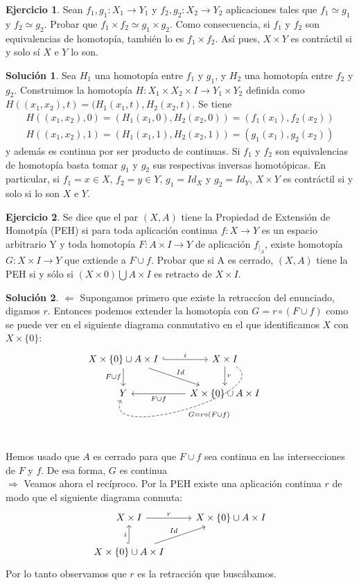 \documentclass{article}
\theoremstyle{plain}
\theoremstyle{definition}
\newtheorem{exercise}{Ejercicio}
\newtheorem*{sol*}{Solución}
\begin{document}
\newpage
\begin{exercise}
Sean $f_1,g_1:X_1\to Y_1$ y $f_2,g_2:X_2\to Y_2$ aplicaciones tales que $f_1\simeq g_1$ y $f_2\simeq g_2$. Probar que $f_1\times f_2\simeq g_1\times g_2$. Como consecuencia, si $f_1$ y $f_2$ son equivalencias de homotopía, también lo es $f_1\times f_2$. Así pues, $X\times Y$ es contráctil si y solo sí $X$ e $Y$ lo son.
\end{exercise}
\begin{sol*}
Sea $H_1$ una homotopía entre $f_1$ y $g_1$, y $H_2$ una homotopía entre $f_2$ y $g_2$. Construimos la homotopía $H:X_1\times X_2\times I\to Y_1\times Y_2$ definida como $H((x_1,x_2),t)=(H_1(x_1,t),H_2(x_2,t)$. Se tiene
\begin{gather*}
H((x_1,x_2),0)=(H_1(x_1,0),H_2(x_2,0))=(f_1(x_1),f_2(x_2))\\
H((x_1,x_2),1)=(H_1(x_1,1),H_2(x_2,1))=(g_1(x_1),g_2(x_2))
\end{gather*}
y además es continua por ser producto de continuas. Si $f_1$ y $f_2$ son equivalencias de homotopía basta tomar $g_1$ y $g_2$ sus respectivas inversas homotópicas. En particular, si $f_1=x\in X$, $f_2=y\in Y$, $g_1=Id_X$ y $g_2=Id_Y$, $X\times Y$ es contráctil si y solo si lo son $X$ e $Y$. 
\end{sol*}
\newpage
\begin{exercise}
Se dice que el par $(X,A)$ tiene la Propiedad de Extensión de Homotpía (PEH) si para toda aplicación continua $f:X\to Y$ es un espacio arbitrario Y y toda homotopía $F:A\times I \to Y$ de aplicación $f_{|_A}$, existe homotopía $G:X\times I \to Y$ que extiende a $F\cup f$. Probar que si A es cerrado, $(X,A)$ tiene la PEH si y sólo si $(X\times 0)\bigcup A\times I$ es retracto de $X\times I$.
\end{exercise}
\begin{sol*}
$\boxed{\Leftarrow}$ Supongamos primero que existe la retraccíon del enunciado, digamos $r$. Entonces podemos extender la homotopía con $G=r\circ(F\cup f)$ como se puede ver en el siguiente diagrama conmutativo en el que identificamos $X$ con $X\times\{0\}$:
\[
\begin{tikzcd}
X\times\{0\}\cup A\times I \arrow[hookrightarrow]{r}{i}\arrow[d,"F\cup f"']\arrow[dr,"Id"]& X\times I\arrow[d, "r"]\arrow[dl,"G=r\circ(F\cup f)", bend left=130,dashed]\\
Y & X\times\{0\}\cup A\times I\arrow[l,"F\cup f"]
\end{tikzcd}
\]
Hemos usado que $A$ es cerrado para que $F\cup f$ sea continua en las intersecciones de $F$ y $f$. De esa forma, $G$ es continua\\
$\boxed{\Rightarrow}$ Veamos ahora el recíproco.  Por la PEH existe una aplicación continua $r$ de modo que el siguiente diagrama conmuta:
\[
\begin{tikzcd}
X\times I \arrow[r,"r"]& X\times\{0\}\cup A\times I\\
X\times\{0\}\cup A\times I\arrow[hookrightarrow]{u}{i}\arrow[ur,"Id"]
\end{tikzcd}
\]
Por lo tanto observamos que $r$ es la retracción que buscábamos.
\end{sol*}
\end{document}
